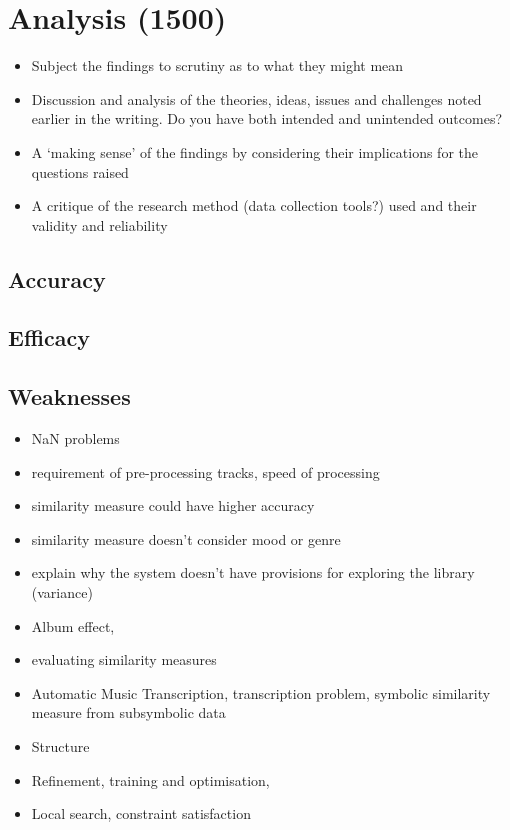 \chapter{Analysis (1500)}
\begin{itemize}
	\item Subject the findings to scrutiny as to what they might mean
	\item Discussion and analysis of the theories, ideas, issues and challenges noted earlier in the writing. Do you have both intended and unintended outcomes?
	\item A `making sense' of the findings by considering their implications for the questions raised
	\item A critique of the research method (data collection tools?) used and their validity and reliability
\end{itemize}
\section{Accuracy}
\section{Efficacy}
\section{Weaknesses}
\begin{itemize}
	\item NaN problems
	\item requirement of pre-processing tracks, speed of processing
	\item similarity measure could have higher accuracy
	\item similarity measure doesn't consider mood or genre
	\item explain why the system doesn't have provisions for exploring the library (variance)
\end{itemize}
\begin{itemize}
	\item Album effect, \citet*{Kim2006}
	\item evaluating similarity measures \citet*{Aucouturier2004}
	\item Automatic Music Transcription, transcription problem, symbolic similarity measure from subsymbolic data \citet*{Aucouturier2004}
	\item Structure \citet*{Bruderer2006}
	\item Refinement, training and optimisation, \citet*{Bruderer2006}
	\item Local search, constraint satisfaction \citet*{Vossen2005}
\end{itemize}

